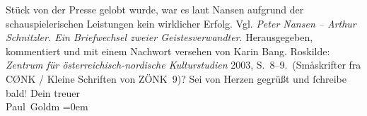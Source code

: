 \begin{ledgroupsized}[t]{13cm}
{{{                  Stück von der Presse gelobt wurde, war es laut Nansen aufgrund der schauspielerischen Leistungen kein wirklicher Erfolg.
                     Vgl. \emph{Peter Nansen – Arthur Schnitzler. Ein Briefwechsel
                        zweier Geistesverwandter}. Herausgegeben, kommentiert und mit einem
                     Nachwort versehen von Karin Bang. Roskilde:
                        \emph{Zentrum für österreichisch-nordische Kulturstudien}{ }2003, S. 8–9. (Småskrifter fra CØNK / Kleine Schriften
                     von ZÖNK 9)}}}\label{K_L02806-4h}?\pend
           \pstart
           Sei von Herzen gegrüßt und ſchreibe bald\textcolor{gray}{!}\pend
           \pstart
           Dein treuer {\\[\baselineskip]}\spacefill\mbox{Paul Goldm}\pend
           \leftskip=0em{}
         
         \endnumbering{}\end{ledgroupsized}  \newcommand{\dateiname}{L02806}\newcommand{\titel}{Paul Goldmann an Arthur Schnitzler, 22. 3. [1897]}\newcommand{\editorInnen}{Martin Anton Müller und Laura Untner}
      